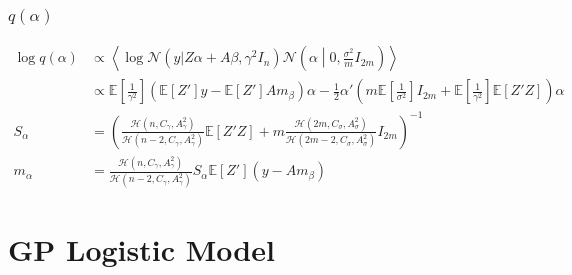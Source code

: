 \documentclass[11pt]{article}
\begin{document}
\subsubsection{$q\left(\alpha\right)$}
\begin{align*}
  \log q\left(\alpha\right) &\propto \left\langle\log\mathcal{N}\left(y|Z\alpha + A\beta, \gamma^{2}I_{n}\right)\mathcal{N}\left(\alpha\middle| 0, \frac{\sigma^{2}}{m}I_{2m}\right)\right\rangle\\
  &\propto \mathbb{E}\left[\frac{1}{\gamma^{2}}\right]\left(\mathbb{E}\left[Z'\right]y - \mathbb{E}\left[Z'\right]Am_{\beta}\right)\alpha - \frac{1}{2}\alpha' \left(m\mathbb{E}\left[\frac{1}{\sigma^{2}}\right]I_{2m} +\mathbb{E}\left[\frac{1}{\gamma^{2}}\right]\mathbb{E}\left[Z'Z\right]\right)\alpha\\
  S_{\alpha} &= \left(\frac{\mathcal{H}\left(n, C_{\gamma}, A_{\gamma}^{2}\right)}{\mathcal{H}\left(n-2, C_{\gamma}, A_{\gamma}^{2}\right)}\mathbb{E}\left[Z'Z\right] +m\frac{\mathcal{H}\left(2m, C_{\sigma}, A_{\sigma}^{2}\right)}{\mathcal{H}\left(2m-2, C_{\sigma}, A_{\sigma}^{2}\right)}I_{2m} \right)^{-1}\\
  m_{\alpha} &= \frac{\mathcal{H}\left(n, C_{\gamma}, A_{\gamma}^{2}\right)}{\mathcal{H}\left(n-2, C_{\gamma}, A_{\gamma}^{2}\right)}S_{\alpha}\mathbb{E}\left[Z'\right] \left(y - Am_{\beta}\right)
\end{align*}
\section{GP Logistic Model}
\end{document}
